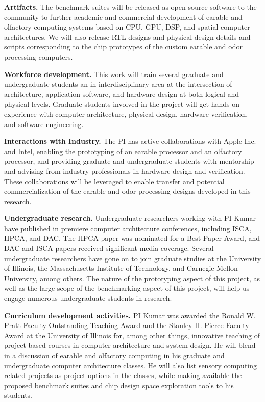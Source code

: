 \textbf{Artifacts.} The benchmark suites will be
released as open-source software to the community to further academic and
commercial development of earable and olfactory computing systems based on CPU, GPU, DSP, and
spatial computer architectures. We will also release RTL designs and physical design details and scripts corresponding to the chip prototypes of the custom earable
and odor processing computers.

\textbf{Workforce development.}  This work will train several graduate and
undergraduate students an in interdisciplinary area at the intersection of
architecture, application software, and hardware design at both logical and
physical levels.  Graduate students involved in the project will get hands-on
experience with computer architecture, physical design, hardware verification,
and software engineering.

\textbf{Interactions with Industry.}  The PI has active collaborations with
Apple Inc. and Intel, enabling the prototyping of an earable processor and an olfactory processor, and
providing graduate and undergraduate students with mentorship and advising from
industry professionals in hardware design and verification.  These collaborations will be leveraged to enable transfer and potential
commercialization of the earable and odor processing designs developed in this
research.

\textbf{Undergraduate research.}  Undergraduate researchers working with PI
Kumar have published in premiere computer architecture conferences,
including ISCA, HPCA, and DAC.  The HPCA paper was nominated for a Best Paper
Award, and DAC and ISCA papers received significant media coverage.  Several
undergraduate researchers have gone on to join graduate studies at the
University of Illinois, the Massachusetts Institute of Technology, and Carnegie
Mellon University, among others.  The nature of the prototyping aspect of this
project, as well as the large scope of the benchmarking aspect of this project,
will help us engage numerous undergraduate students in research.

\textbf{Curriculum development activities.}  PI Kumar was  awarded the
Ronald W. Pratt Faculty Outstanding Teaching Award and the Stanley H. Pierce
Faculty Award at the University of Illinois for, among other things, innovative
teaching of project-based courses in computer architecture and system design.
He will blend in a discussion of earable and olfactory computing in his graduate and
undergraduate computer architecture classes.  He will also list sensory
computing related projects as project options in the classes, while making
available the proposed  benchmark suites and chip design space
exploration tools to his students.

